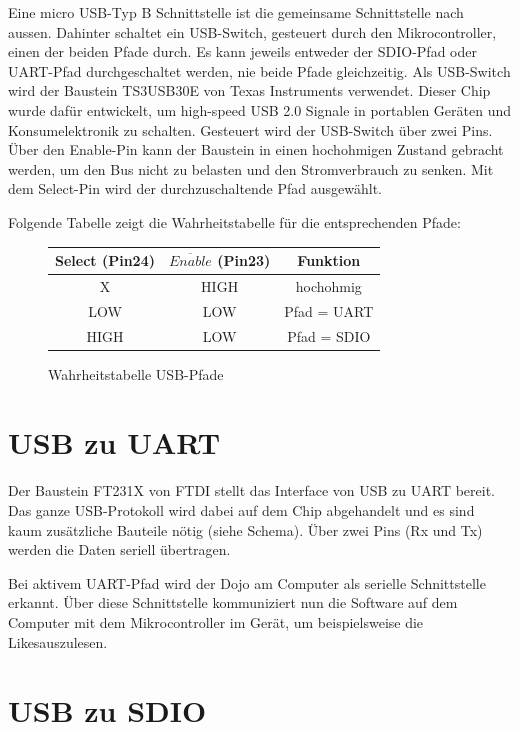 Eine micro USB-Typ B Schnittstelle ist die gemeinsame Schnittstelle nach aussen. Dahinter schaltet ein USB-Switch, gesteuert durch den Mikrocontroller, einen der beiden Pfade durch. Es kann jeweils entweder der SDIO-Pfad oder UART-Pfad durchgeschaltet werden, nie beide Pfade gleichzeitig.\newline
Als USB-Switch wird der Baustein TS3USB30E von Texas Instruments verwendet. Dieser Chip wurde dafür entwickelt, um high-speed USB 2.0 Signale in portablen Geräten und Konsumelektronik zu schalten. Gesteuert wird der USB-Switch über zwei Pins. Über den Enable-Pin kann der Baustein in einen hochohmigen Zustand gebracht werden, um den Bus nicht zu belasten und den Stromverbrauch zu senken. Mit dem Select-Pin wird der durchzuschaltende Pfad ausgewählt.

Folgende Tabelle zeigt die Wahrheitstabelle für die entsprechenden Pfade:
\begin{figure}[h]
	\centering
	\begin{tabular}{|c|c|c|} 
		Select (Pin24) & $\overline{Enable}$ (Pin23) & Funktion \\ 
		\hline 
		X & HIGH & hochohmig \\ 
		\hline 
		LOW & LOW & Pfad = UART \\ 
		\hline 
		HIGH & LOW & Pfad = SDIO \\ 
	\end{tabular} 
	\caption{Wahrheitstabelle USB-Pfade}
	\label{truth_table_usb}
\end{figure}

\section{USB zu UART}

Der Baustein FT231X von FTDI stellt das Interface von USB zu UART bereit. Das ganze USB-Protokoll wird dabei auf dem Chip abgehandelt und es sind kaum zusätzliche Bauteile nötig (siehe Schema). Über zwei Pins (Rx und Tx) werden die Daten seriell übertragen.

Bei aktivem UART-Pfad wird der Dojo am Computer als serielle Schnittstelle erkannt. Über diese Schnittstelle kommuniziert nun die Software auf dem Computer mit dem Mikrocontroller im Gerät, um beispielsweise die \flq Likes\frq  auszulesen.


\section{USB zu SDIO}

